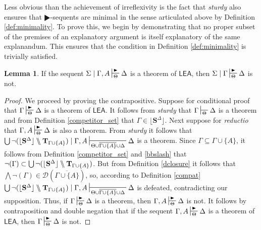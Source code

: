 \documentclass{article}
\theoremstyle{definition}
\theoremstyle{definition}
\theoremstyle{definition}
\newtheorem{lemma}{Lemma}
\theoremstyle{definition}
\theoremstyle{remark}
\theoremstyle{definition}
\theoremstyle{definition}
\begin{document}
\vspace{2mm}

Less obvious than the achievement of irreflexivity is the fact that \textit{sturdy} also ensures that $ \RHD$-sequents are minimal in the sense articulated above by Definition \ref{def:minimality}. To prove this, we begin by demonstrating that no proper subset of the premises of an explanatory argument is itself explanatory of the same explanandum. This ensures that the condition in Definition \ref{def:minimality} is trivially satisfied. 


\begin{lemma}\label{lem:psubset}
	If the sequent $ \Sigma\mid \Gamma, A \sststile{\Theta}{\RHD} \Delta $ is a theorem of $ \mathsf{LEA}$, then  $ \Sigma\mid \Gamma \sststile{\Theta}{\RHD} \Delta $ is not.
	
	\begin{proof}
		We proceed by proving the contrapositive. Suppose for conditional proof that $ \Gamma\sststile{\Theta}{\RHD} \Delta $ is a theorem of $ \mathsf{LEA}$. It follows from \textit{sturdy} that $ \Gamma\sststile{\Theta}{} \Delta $ is a theorem and from Definition \ref{competitor_set} that $ \Gamma \in \lfloor \mathbf{S}^\Delta \rfloor$. Next suppose for \textit{reductio} that $ \Gamma, A \sststile{\Theta}{\RHD} \Delta $ is also a theorem. From \textit{sturdy} it follows that $\bigcup\neg(\lfloor \mathbf{S}^\Delta \rfloor\bbslash\mathbf{T}_{\Gamma\cup \{A\}})\mid\Gamma, A \sststile{\Theta\cup \overline{\Gamma\cup \{A\} }\cup\Delta}{}\Delta$ is a theorem. Since $ \Gamma \subseteq \Gamma\cup\{A\} $, it follows from Definition \ref{competitor_set} and \ref{bbslash} that $ \neg(\Gamma) \subset \bigcup\neg(\lfloor \mathbf{S}^\Delta \rfloor\bbslash\mathbf{T}_{\Gamma\cup \{A\}}) $. But from Definition \ref{dclosure} it follows that $ \bigwedge\neg(\Gamma) \in \mathcal{D}(\overline{\Gamma\cup\{A\}}) $, so, according to Definition \ref{compat} $\bigcup\neg(\lfloor \mathbf{S}^\Delta \rfloor\bbslash\mathbf{T}_{\Gamma\cup \{A\}})\mid\Gamma, A \sststile{\Theta\cup \overline{\Gamma\cup \{A\} }\cup\Delta}{}\Delta$ is defeated, contradicting our supposition. Thus, if  $ \Gamma\sststile{\Theta}{\RHD} \Delta $ is a theorem, then $ \Gamma, A \sststile{\Theta}{\RHD} \Delta $ is not. It follows by contraposition and double negation that if the sequent $ \Gamma, A \sststile{\Theta}{\RHD} \Delta $ is a theorem of $ \mathsf{LEA}$, then  $ \Gamma \sststile{\Theta}{\RHD} \Delta $ is not.
	\end{proof}
\end{lemma}
\end{document}

